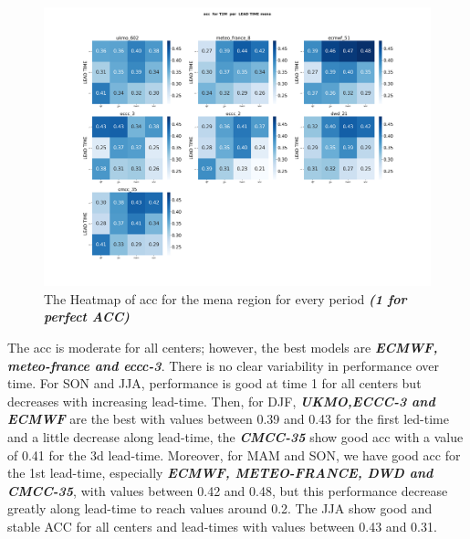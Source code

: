 \begin{figure}[H]
	\centering
	\includegraphics[scale=0.25]{plots/det/acc/acc_T2M_mena.png}
	\caption{The Heatmap of acc for the mena region for every period \textbf{\textit{(1 for perfect ACC)} }}
\end{figure}
The acc is moderate for all centers; however, the best models are \textbf{\textit{ECMWF, meteo-france and eccc-3}}. There is no clear variability in performance over time. For SON and JJA, performance is good at time 1 for all centers but decreases with increasing lead-time. Then, for DJF, \textbf{\textit{UKMO,ECCC-3 and ECMWF}} are the best with values between 0.39 and 0.43 for the first led-time and a little decrease along lead-time, the \textbf{\textit{CMCC-35}} show good acc with a value of 0.41 for the 3d lead-time. Moreover, for MAM and SON, we have good acc for the 1st lead-time, especially \textbf{\textit{ECMWF, METEO-FRANCE, DWD and CMCC-35}}, with values between 0.42 and 0.48, but this performance decrease greatly along lead-time to reach values around 0.2. The JJA show good and stable ACC for all centers and lead-times with values between 0.43 and 0.31. 

